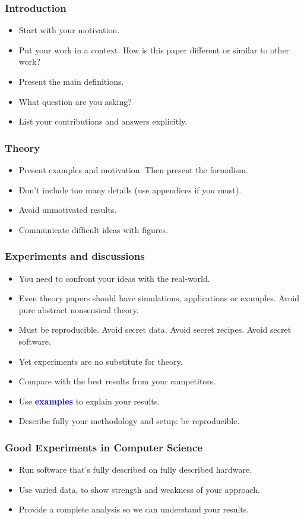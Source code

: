 \documentclass[handout]{beamer}
\newcommand{\important}[1]{\textcolor{blue}{\textbf{#1}}}
\begin{document}
\frame
{
  \frametitle{Introduction}
\begin{itemize}
\item<1-> Start with your motivation.
  \item<2-> Put your work in a context. How is this paper different or similar to other work?
  \item<3->Present the main definitions.
  \item<4->What question are you asking?
  \item<5->List your contributions and answers explicitly.
\end{itemize}

}


\frame
{
  \frametitle{Theory}

\begin{itemize}
  \item<1-> Present examples and motivation. Then present the formalism.
  \item<2-> Don't include too many details (use appendices if you must).
  \item<3-> Avoid unmotivated results.
  \item<4-> Communicate difficult ideas with figures.
\end{itemize}
}


\frame
{
  \frametitle{Experiments and discussions}

\begin{itemize}
 \item<1->You need to confront your ideas with the real-world.
  \item<2-> Even theory papers should have simulations, applications or examples. Avoid pure abstract nonsensical theory.
  \item<3-> Must be reproducible. Avoid secret data. Avoid secret
recipes. Avoid secret software.
  \item<4-> Yet experiments are no substitute for theory.
  \item<5->Compare with the best results from your competitors.
  \item<6-> Use \important{examples} to explain your results.
  \item<7-> Describe fully your methodology and setup: be reproducible.
\end{itemize}
}

\frame
{
  \frametitle{Good Experiments in Computer Science}

\begin{itemize}
 \item<1->Run software that's fully described on fully described hardware.
  \item<2->Use varied data, to show strength and weakness of your approach.
  \item<3->Provide a complete analysis so we can understand your results.
\end{itemize}
}
\end{document}
